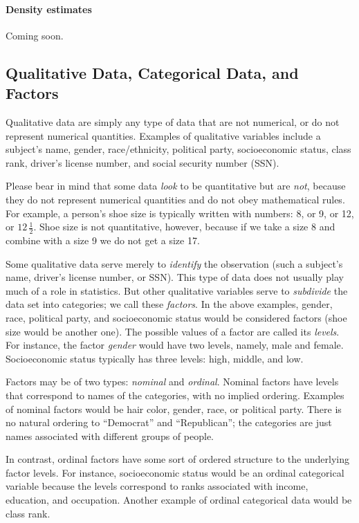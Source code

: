 \documentclass[captions=tableheading]{scrbook}
\begin{document}
\paragraph*{Density estimates}

Coming soon.
\subsection{Qualitative Data, Categorical Data, and Factors}
\label{sec-3-1-3}

\label{sub:Qualitative-Data}

Qualitative data are simply any type of data that are not numerical, or do not represent numerical quantities. Examples of qualitative variables include a subject's name, gender, race/ethnicity, political party, socioeconomic status, class rank, driver's license number, and social security number (SSN).

Please bear in mind that some data \emph{look} to be quantitative but are \emph{not}, because they do not represent numerical quantities and do not obey mathematical rules. For example, a person's shoe size is typically written with numbers: 8, or 9, or 12, or \(12\,\frac{1}{2}\). Shoe size is not quantitative, however, because if we take a size 8 and combine with a size 9 we do not get a size 17.

Some qualitative data serve merely to \emph{identify} the observation (such a subject's name, driver's license number, or SSN). This type of data does not usually play much of a role in statistics. But other qualitative variables serve to \emph{subdivide} the data set into categories; we call these \emph{factors}. In the above examples, gender, race, political party, and socioeconomic status would be considered factors (shoe size would be another one). The possible values of a factor are called its \emph{levels}. For instance, the factor \emph{gender} would have two levels, namely, male and female. Socioeconomic status typically has three levels: high, middle, and low.

Factors may be of two types: \emph{nominal} and \emph{ordinal}. Nominal factors have levels that correspond to names of the categories, with no implied ordering. Examples of nominal factors would be hair color, gender, race, or political party. There is no natural ordering to ``Democrat'' and ``Republican''; the categories are just names associated with different groups of people. 

In contrast, ordinal factors have some sort of ordered structure to the underlying factor levels. For instance, socioeconomic status would be an ordinal categorical variable because the levels correspond to ranks associated with income, education, and occupation. Another example of ordinal categorical data would be class rank.
\end{document}
